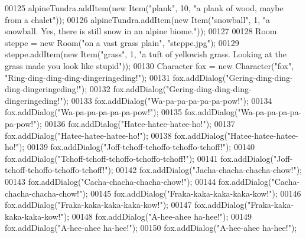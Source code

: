 \begin{DoxyCode}
00125         alpineTundra.addItem(\textcolor{keyword}{new} Item(\textcolor{stringliteral}{"plank"}, 10, \textcolor{stringliteral}{"a plank of wood, maybe from a chalet"}));
00126         alpineTundra.addItem(\textcolor{keyword}{new} Item(\textcolor{stringliteral}{"snowball"}, 1, \textcolor{stringliteral}{"a snowball. Yes, there is still snow in an alpine
       biome."}));
00127 
00128         Room steppe = \textcolor{keyword}{new} Room(\textcolor{stringliteral}{"on a vast grass plain"}, \textcolor{stringliteral}{"steppe.jpg"});
00129         steppe.addItem(\textcolor{keyword}{new} Item(\textcolor{stringliteral}{"grass"}, 1, \textcolor{stringliteral}{"a tuft of yellowish grass. Looking at the grass made you look
       like stupid"}));
00130         Character fox = \textcolor{keyword}{new} Character(\textcolor{stringliteral}{"fox"}, \textcolor{stringliteral}{"Ring-ding-ding-ding-dingeringeding!"});
00131         fox.addDialog(\textcolor{stringliteral}{"Gering-ding-ding-ding-dingeringeding!"});
00132         fox.addDialog(\textcolor{stringliteral}{"Gering-ding-ding-ding-dingeringeding!"});
00133         fox.addDialog(\textcolor{stringliteral}{"Wa-pa-pa-pa-pa-pa-pow!"});
00134         fox.addDialog(\textcolor{stringliteral}{"Wa-pa-pa-pa-pa-pa-pow!"});
00135         fox.addDialog(\textcolor{stringliteral}{"Wa-pa-pa-pa-pa-pa-pow!"});
00136         fox.addDialog(\textcolor{stringliteral}{"Hatee-hatee-hatee-ho!"});
00137         fox.addDialog(\textcolor{stringliteral}{"Hatee-hatee-hatee-ho!"});
00138         fox.addDialog(\textcolor{stringliteral}{"Hatee-hatee-hatee-ho!"});
00139         fox.addDialog(\textcolor{stringliteral}{"Joff-tchoff-tchoffo-tchoffo-tchoff!"});
00140         fox.addDialog(\textcolor{stringliteral}{"Tchoff-tchoff-tchoffo-tchoffo-tchoff!"});
00141         fox.addDialog(\textcolor{stringliteral}{"Joff-tchoff-tchoffo-tchoffo-tchoff!"});
00142         fox.addDialog(\textcolor{stringliteral}{"Jacha-chacha-chacha-chow!"});
00143         fox.addDialog(\textcolor{stringliteral}{"Cacha-chacha-chacha-chow!"});
00144         fox.addDialog(\textcolor{stringliteral}{"Cacha-chacha-chacha-chow!"});
00145         fox.addDialog(\textcolor{stringliteral}{"Fraka-kaka-kaka-kaka-kow!"});
00146         fox.addDialog(\textcolor{stringliteral}{"Fraka-kaka-kaka-kaka-kow!"});
00147         fox.addDialog(\textcolor{stringliteral}{"Fraka-kaka-kaka-kaka-kow!"});
00148         fox.addDialog(\textcolor{stringliteral}{"A-hee-ahee ha-hee!"});
00149         fox.addDialog(\textcolor{stringliteral}{"A-hee-ahee ha-hee!"});
00150         fox.addDialog(\textcolor{stringliteral}{"A-hee-ahee ha-hee!"});

\end{DoxyCode}
